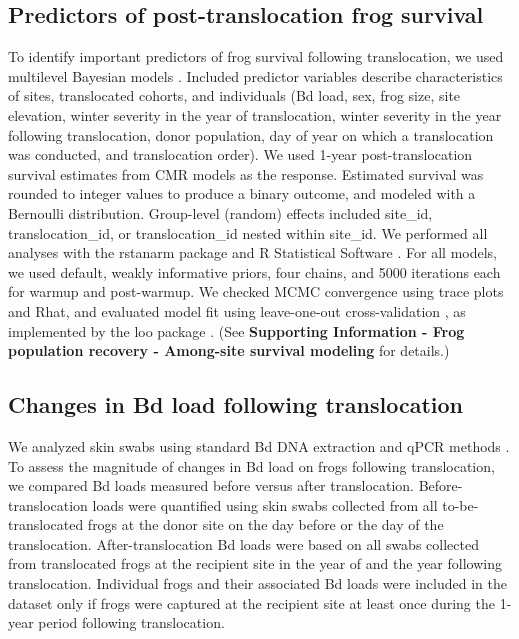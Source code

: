 \documentclass[9pt,twocolumn,twoside,lineno]{pnas-new}
\begin{document}
{\hypertarget{predictors-of-post-translocation-frog-survival}{%
\subsection*{Predictors of post-translocation frog
survival}\label{predictors-of-post-translocation-frog-survival}}

To identify important predictors of frog survival following
translocation, we used multilevel Bayesian models
\citep{gelman2013, gabry2019}. Included predictor variables describe
characteristics of sites, translocated cohorts, and individuals (Bd
load, sex, frog size, site elevation, winter severity in the year of
translocation, winter severity in the year following translocation,
donor population, day of year on which a translocation was conducted,
and translocation order). We used 1-year post-translocation survival
estimates from CMR models as the response. Estimated survival was
rounded to integer values to produce a binary outcome, and modeled with
a Bernoulli distribution. Group-level (random) effects included
site\_id, translocation\_id, or translocation\_id nested within
site\_id. We performed all analyses with the rstanarm package
\citep{rstanarm2022} and R Statistical Software
\citep[v4.4.4,][]{rsoftware2022}. For all models, we used default,
weakly informative priors, four chains, and 5000 iterations each for
warmup and post-warmup. We checked MCMC convergence using trace plots
and Rhat, and evaluated model fit using leave-one-out cross-validation
\citep{vehtari2016}, as implemented by the loo package
\citep{vehtari2022}. (See \textbf{Supporting Information - Frog
population recovery - Among-site survival modeling} for details.)

\hypertarget{changes-in-bd-load-following-translocation}{%
\subsection*{Changes in Bd load following
translocation}\label{changes-in-bd-load-following-translocation}}

We analyzed skin swabs using standard Bd DNA extraction and qPCR methods
\citep[see \textbf{Supporting Information-Frog population recovery -
Laboratory methods} for details]{boyle2004}. To assess the magnitude of
changes in Bd load on frogs following translocation, we compared Bd
loads measured before versus after translocation. Before-translocation
loads were quantified using skin swabs collected from all
to-be-translocated frogs at the donor site on the day before or the day
of the translocation. After-translocation Bd loads were based on all
swabs collected from translocated frogs at the recipient site in the
year of and the year following translocation. Individual frogs and their
associated Bd loads were included in the dataset only if frogs were
captured at the recipient site at least once during the 1-year period
following translocation.

}
\end{document}
